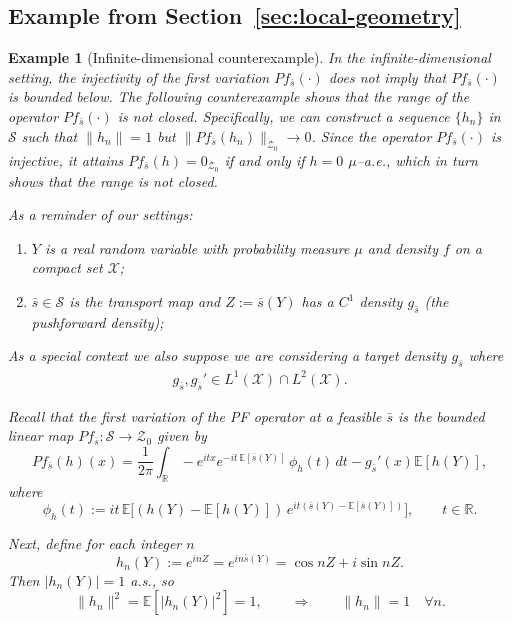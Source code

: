 \documentclass[12pt,leqno]{amsart}
\newtheorem{example}{Example}
\begin{document}
\subsection{Example from Section~\ref{sec:local-geometry}}
\begin{example}[Infinite-dimensional counterexample]\label{ex:infinite-counterexample}
In the infinite-dimensional setting, the injectivity of the first variation $Pf_{\bar{s}}(\cdot)$ does not imply that $Pf_{\bar{s}}(\cdot)$ is bounded below. The following counterexample shows that the range of the operator $Pf_{\bar{s}}(\cdot)$ is not closed. Specifically, we can construct a sequence $\{h_n\}$ in $\mathcal{S}$ such that $\|h_n\| = 1$ but $\|Pf_{\bar{s}}(h_n)\|_{\mathcal{Z}_0}\to 0$. Since the operator $Pf_{\bar{s}}(\cdot)$ is injective, it attains $Pf_{\bar{s}}(h) = 0_{\mathcal{Z}_0}$ if and only if $h=0$ $\mu$--a.e., which in turn shows that the range is not closed.

As a reminder of our settings:
\begin{enumerate}
  \item $Y$ is a real random variable with probability measure $\mu$ and density $f$ on a compact set $\mathcal{X}$;
  \item $\bar{s}\in\mathcal{S}$ is the transport map and $Z := \bar{s}(Y)$ has a $C^1$ density $g_{\bar{s}}$ (the pushforward density);
\end{enumerate}
As a special context we also suppose we are considering a target density $g_{\bar{s}}$ where
\begin{align*}
    g_{\bar{s}},g_{\bar{s}}' \in L^1(\mathcal{X}) \cap L^2(\mathcal{X}).
\end{align*}

Recall that the first variation of the PF operator at a feasible $\bar{s}$ is the bounded linear map $Pf_{\bar{s}}:\mathcal{S}\to \mathcal{Z}_0$ given by
\begin{equation}\label{eq:Ps-linearized}
Pf_{\bar{s}}(h)(x)
  = \frac{1}{2\pi}\int_{\mathbb{R}} -e^{itx} e^{-it\,\mathbb{E}[\bar{s}(Y)]}\,
    \phi_h(t)\,dt - g_{\bar{s}}'(x)\mathbb{E}[h(Y)],
\end{equation}
where
\begin{equation}\label{eq:phi-def-counter}
\phi_h(t)
 := it\,\mathbb{E}\big[(h(Y)-\mathbb{E}[h(Y)])\,
      e^{it(\bar{s}(Y)-\mathbb{E}[\bar{s}(Y)])}\big],\qquad t\in\mathbb{R}.
\end{equation}

Next, define for each integer $n$
\[
h_n(Y) := e^{inZ} = e^{in \bar{s}(Y)} = \cos nZ + i\sin nZ.
\]
Then $|h_n(Y)| = 1$ a.s., so
\[
\|h_n\|^2 = \mathbb{E}[|h_n(Y)|^2] = 1,
\qquad\Rightarrow\qquad
\|h_n\| = 1 \quad \forall n.
\]


\end{example}
\end{document}
